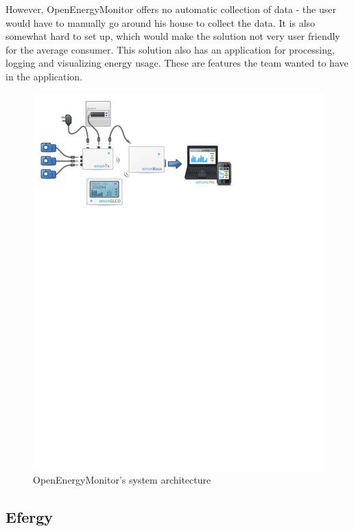 However, OpenEnergyMonitor offers no automatic collection of data - the user would have to manually go around his house to collect the data. It is also somewhat hard to set up, which would make the solution not very user friendly for the average consumer. This solution also has an application for processing, logging and visualizing energy usage. These are features the team wanted to have in the application.

\setcounter{figure}{1}
\begin{figure}[H]
\centering
\includegraphics[width=\textwidth, trim=0.5cm 19cm 6.5cm 0cm, clip]{ch/prestudy/fig/OEM_system.pdf}
\caption{OpenEnergyMonitor's system architecture}
\label{fig:oem}
\end{figure}




\newpage
\subsection{Efergy}

